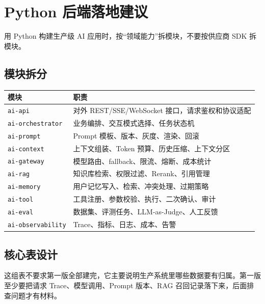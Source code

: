 \documentclass[9pt,a4paper,twocolumn]{ctexart}
\begin{document}
\section*{Python 后端落地建议}


用 Python 构建生产级 AI 应用时，按“领域能力”拆模块，不要按供应商 SDK 拆模块。



\subsection*{模块拆分}

{\footnotesize
\begin{tabular}{|p{}|p{}|}
\hline
\textbf{模块} & \textbf{职责} \\
\hline
\texttt{ai-api} & 对外 REST/SSE/WebSocket 接口，请求鉴权和协议适配 \\
\hline
\texttt{ai-orchestrator} & 业务编排、交互模式选择、任务状态机 \\
\hline
\texttt{ai-prompt} & Prompt 模板、版本、灰度、渲染、回滚 \\
\hline
\texttt{ai-context} & 上下文组装、Token 预算、历史压缩、上下文分区 \\
\hline
\texttt{ai-gateway} & 模型路由、fallback、限流、熔断、成本统计 \\
\hline
\texttt{ai-rag} & 知识库检索、权限过滤、Rerank、引用管理 \\
\hline
\texttt{ai-memory} & 用户记忆写入、检索、冲突处理、过期策略 \\
\hline
\texttt{ai-tool} & 工具注册、参数校验、执行、二次确认、审计 \\
\hline
\texttt{ai-eval} & 数据集、评测任务、LLM-as-Judge、人工反馈 \\
\hline
\texttt{ai-observability} & Trace、指标、日志、成本、告警 \\
\hline
\end{tabular}
}



\subsection*{核心表设计}


这组表不要求第一版全部建完，它主要说明生产系统里哪些数据要有归属。第一版至少要把请求 Trace、模型调用、Prompt 版本、RAG 召回记录落下来，后面排查问题才有材料。
\end{document}
